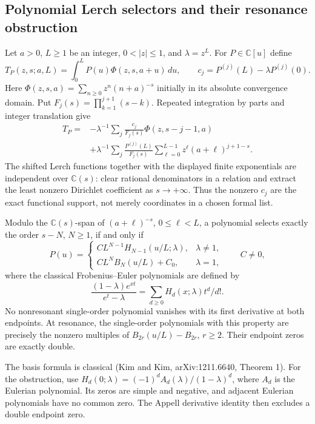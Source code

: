 \subsection{Polynomial Lerch selectors and their resonance obstruction}
\label{plsint:section}

Let $a>0$, $L\ge1$ be an integer, $0<|z|\le1$, and $\lambda=z^L$.
For $P\in\mathbb C[u]$ define
\[
 T_P(z,s;a,L)=\int_0^L P(u)\Phi(z,s,a+u)\,du,
 \qquad c_j=P^{(j)}(L)-\lambda P^{(j)}(0).
\]
Here $\Phi(z,s,a)=\sum_{n\ge0}z^n(n+a)^{-s}$ initially in its
absolute convergence domain. Put $F_j(s)=\prod_{k=1}^{j+1}(s-k)$.
Repeated integration by parts and integer translation give
\begin{align*}
 T_P={}&-\lambda^{-1}\sum_j\frac{c_j}{F_j(s)}\Phi(z,s-j-1,a)\\
 &+\lambda^{-1}\sum_j\frac{P^{(j)}(L)}{F_j(s)}
                      \sum_{\ell=0}^{L-1}z^\ell(a+\ell)^{j+1-s}.
\end{align*}
The shifted Lerch functions together with the displayed finite
exponentials are independent over $\mathbb C(s)$: clear rational
denominators in a relation and extract the least nonzero Dirichlet
coefficient as $s\to+\infty$. Thus the nonzero $c_j$ are the exact
functional support, not merely coordinates in a chosen formal list.

\begin{theorem}
\label{plsint:classification}
Modulo the $\mathbb C(s)$-span of $(a+\ell)^{-s}$, $0\le\ell<L$,
a polynomial selects exactly the order $s-N$, $N\ge1$, if and only if
\[
 P(u)=\begin{cases}
 C L^{N-1}H_{N-1}(u/L;\lambda),&\lambda\ne1,\\
 C L^N B_N(u/L)+C_0,&\lambda=1,
 \end{cases}\qquad C\ne0,
\]
where the classical Frobenius--Euler polynomials are defined by
\[
 \frac{(1-\lambda)e^{xt}}{e^t-\lambda}
       =\sum_{d\ge0}H_d(x;\lambda)t^d/d!.
\]
No nonresonant single-order polynomial vanishes with its first
 derivative at both endpoints. At resonance, the single-order
polynomials with this property are precisely the nonzero multiples of
$B_{2r}(u/L)-B_{2r}$, $r\ge2$. Their endpoint zeros are exactly double.
\end{theorem}

The basis formula is classical (Kim and Kim, arXiv:1211.6640, Theorem 1).
For the obstruction, use
$H_d(0;\lambda)=(-1)^d A_d(\lambda)/(1-\lambda)^d$,
where $A_d$ is the Eulerian polynomial. Its zeros are simple and
negative, and adjacent Eulerian polynomials have no common zero.
The Appell derivative identity then excludes a double endpoint zero.


